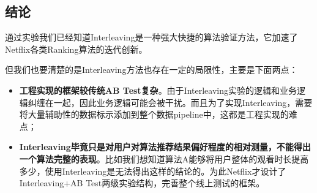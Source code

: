 \documentclass[12pt]{article}
\begin{document}
\subsection{结论}
通过实验我们已经知道Interleaving是一种强大快捷的算法验证方法，它加速了Netflix各类Ranking算法的迭代创新。

但我们也要清楚的是Interleaving方法也存在一定的局限性，主要是下面两点：
\begin{itemize}
\setlength{\itemsep}{0pt}
\setlength{\parsep}{0pt}
\setlength{\parskip}{0pt}
    \item \textbf{工程实现的框架较传统AB Test复杂}。由于Interleaving实验的逻辑和业务逻辑纠缠在一起，因此业务逻辑可能会被干扰。而且为了实现Interleaving，需要将大量辅助性的数据标示添加到整个数据pipeline中，这都是工程实现的难点；
    \item \textbf{Interleaving毕竟只是对用户对算法推荐结果偏好程度的相对测量，不能得出一个算法完整的表现}。比如我们想知道算法A能够将用户整体的观看时长提高多少，使用Interleaving是无法得出这样的结论的。为此Netflix才设计了Interleaving+AB Test两级实验结构，完善整个线上测试的框架。
\end{itemize}




\end{document}
